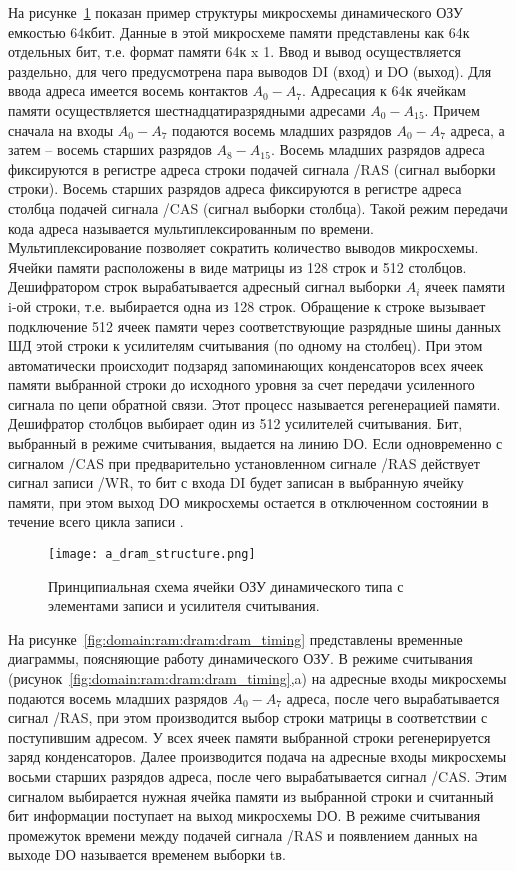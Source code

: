 На рисунке~\ref{fig:domain:ram:dram:dram_structure} показан пример структуры микросхемы динамического ОЗУ емкостью 64кбит. Данные в этой микросхеме памяти представлены как 64к отдельных бит, т.е. формат памяти 64к x 1. Ввод и вывод осуществляется раздельно, для чего предусмотрена пара выводов DI (вход) и DО (выход). Для ввода адреса имеется восемь контактов $A_0 - A_7$. Адресация к 64к ячейкам памяти осуществляется шестнадцатиразрядными адресами $A_0 - A_15$. Причем сначала на входы $A_0 - A_7$ подаются восемь младших разрядов $A_0 - A_7$ адреса, а затем – восемь старших разрядов $A_8 - A_15$. Восемь младших разрядов адреса фиксируются в регистре адреса строки подачей сигнала /RAS (сигнал выборки строки). Восемь старших разрядов адреса фиксируются в регистре адреса столбца подачей сигнала /CAS (сигнал выборки столбца). Такой режим передачи кода адреса называется мультиплексированным по времени. Мультиплексирование позволяет сократить количество выводов микросхемы. Ячейки памяти расположены в виде матрицы из 128 строк и 512 столбцов. Дешифратором строк вырабатывается адресный сигнал выборки $A_i$ ячеек памяти i-ой строки, т.е. выбирается одна из 128 строк. Обращение к строке вызывает подключение 512 ячеек памяти через соответствующие разрядные шины данных ШД этой строки к усилителям считывания (по одному на столбец). При этом автоматически происходит подзаряд запоминающих конденсаторов всех ячеек памяти выбранной строки до исходного уровня за счет передачи усиленного сигнала по цепи обратной связи. Этот процесс называется регенерацией памяти. Дешифратор столбцов выбирает один из 512 усилителей считывания. Бит, выбранный в режиме считывания, выдается на линию DО. Если одновременно с сигналом /CAS при предварительно установленном сигнале /RAS действует сигнал записи /WR, то бит с входа DI будет записан в выбранную ячейку памяти, при этом выход DО микросхемы остается в отключенном состоянии в течение всего цикла записи \cite{dram_tutorial}.

\begin{figure}[ht]
\centering
  \texttt{[image: a\_dram\_structure.png]}  
  \caption{ Принципиальная схема ячейки ОЗУ динамического типа с элементами записи и усилителя считывания. }
  \label{fig:domain:ram:dram:dram_structure}
\end{figure}

На рисунке~\ref{fig:domain:ram:dram:dram_timing} представлены временные диаграммы, поясняющие работу динамического ОЗУ. В режиме считывания (рисунок~\ref{fig:domain:ram:dram:dram_timing},a) на адресные входы микросхемы подаются восемь младших разрядов $A_0 - A_7$ адреса, после чего вырабатывается сигнал /RAS, при этом производится выбор строки матрицы в соответствии с поступившим адресом. У всех ячеек памяти выбранной строки регенерируется заряд конденсаторов. Далее производится подача на адресные входы микросхемы восьми старших разрядов адреса, после чего вырабатывается сигнал /CAS. Этим сигналом выбирается нужная ячейка памяти из выбранной строки и считанный бит информации поступает на выход микросхемы DО. В режиме считывания промежуток времени между подачей сигнала /RAS и появлением данных на выходе DО называется временем выборки tв.

